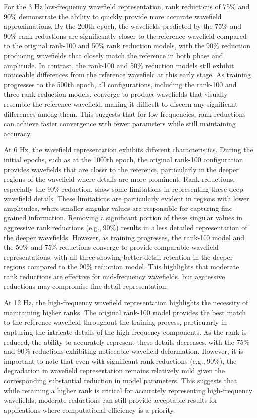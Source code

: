 For the 3 Hz low-frequency wavefield representation, rank reductions of 75\% and 90\% demonstrate the ability to quickly provide more accurate wavefield approximations. By the 200th epoch, the wavefields predicted by the 75\% and 90\% rank reductions are significantly closer to the reference wavefield compared to the original rank-100 and 50\% rank reduction models, with the 90\% reduction producing wavefields that closely match the reference in both phase and amplitude. In contrast, the rank-100 and 50\% reduction models still exhibit noticeable differences from the reference wavefield at this early stage. As training progresses to the 500th epoch, all configurations, including the rank-100 and three rank-reduction models, converge to produce wavefields that visually resemble the reference wavefield, making it difficult to discern any significant differences among them. This suggests that for low frequencies, rank reductions can achieve faster convergence with fewer parameters while still maintaining accuracy. 

At 6 Hz, the wavefield representation exhibits different characteristics. During the initial epochs, such as at the 1000th epoch, the original rank-100 configuration provides wavefields that are closer to the reference, particularly in the deeper regions of the wavefield where details are more prominent. Rank reductions, especially the 90\% reduction, show some limitations in representing these deep wavefield details. These limitations are particularly evident in regions with lower amplitudes, where smaller singular values are responsible for capturing fine-grained information. Removing a significant portion of these singular values in aggressive rank reductions (e.g., 90\%) results in a less detailed representation of the deeper wavefields. However, as training progresses, the rank-100 model and the 50\% and 75\% reductions converge to provide comparable wavefield representations, with all three showing better detail retention in the deeper regions compared to the 90\% reduction model. This highlights that moderate rank reductions are effective for mid-frequency wavefields, but aggressive reductions may compromise fine-detail representation. 

At 12 Hz, the high-frequency wavefield representation highlights the necessity of maintaining higher ranks. The original rank-100 model provides the best match to the reference wavefield throughout the training process, particularly in capturing the intricate details of the high-frequency components. As the rank is reduced, the ability to accurately represent these details decreases, with the 75\% and 90\% reductions exhibiting noticeable wavefield deformation. However, it is important to note that even with significant rank reductions (e.g., 90\%), the degradation in wavefield representation remains relatively mild given the corresponding substantial reduction in model parameters. This suggests that while retaining a higher rank is critical for accurately representing high-frequency wavefields, moderate reductions can still provide acceptable results for applications where computational efficiency is a priority. 


